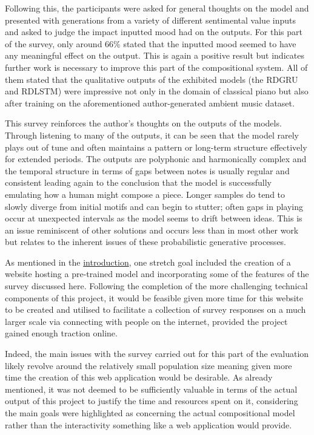 \documentclass[12pt,]{article}
\begin{document}
Following this, the participants were asked for general thoughts on the
model and presented with generations from a variety of different
sentimental value inputs and asked to judge the impact inputted mood had
on the outputs. For this part of the survey, only around 66\% stated
that the inputted mood seemed to have any meaningful effect on the
output. This is again a positive result but indicates further work is
necessary to improve this part of the compositional system. All of them
stated that the qualitative outputs of the exhibited models (the RDGRU
and RDLSTM) were impressive not only in the domain of classical piano
but also after training on the aforementioned author-generated ambient
music dataset.

This survey reinforces the author's thoughts on the outputs of the
models. Through listening to many of the outputs, it can be seen that
the model rarely plays out of tune and often maintains a pattern or
long-term structure effectively for extended periods. The outputs are
polyphonic and harmonically complex and the temporal structure in terms
of gaps between notes is usually regular and consistent leading again to
the conclusion that the model is successfully emulating how a human
might compose a piece. Longer samples do tend to slowly diverge from
initial motifs and can begin to stutter; often gaps in playing occur at
unexpected intervals as the model seems to drift between ideas. This is
an issue reminiscent of other solutions and occurs less than in most
other work but relates to the inherent issues of these probabilistic
generative processes.

As mentioned in the \protect\hyperlink{introduction}{introduction}, one
stretch goal included the creation of a website hosting a pre-trained
model and incorporating some of the features of the survey discussed
here. Following the completion of the more challenging technical
components of this project, it would be feasible given more time for
this website to be created and utilised to facilitate a collection of
survey responses on a much larger scale via connecting with people on
the internet, provided the project gained enough traction online.

Indeed, the main issues with the survey carried out for this part of the
evaluation likely revolve around the relatively small population size
meaning given more time the creation of this web application would be
desirable. As already mentioned, it was not deemed to be sufficiently
valuable in terms of the actual output of this project to justify the
time and resources spent on it, considering the main goals were
highlighted as concerning the actual compositional model rather than the
interactivity something like a web application would provide.
\end{document}

